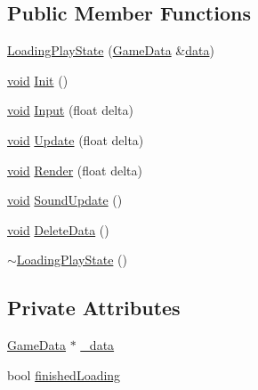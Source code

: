 \subsection*{Public Member Functions}
\begin{DoxyCompactItemize}
\item 
\hyperlink{classLoadingPlayState_a9715c14eced0140ceb64d6e30d00901e}{Loading\+Play\+State} (\hyperlink{structGameData}{Game\+Data} \&\hyperlink{imgui__impl__opengl3__loader_8h_abd87654504355b4c1bb002dcb1d4d16a}{data})
\item 
\hyperlink{imgui__impl__opengl3__loader_8h_ac668e7cffd9e2e9cfee428b9b2f34fa7}{void} \hyperlink{classLoadingPlayState_aaa131760db87f7dd206064105b53004c}{Init} ()
\item 
\hyperlink{imgui__impl__opengl3__loader_8h_ac668e7cffd9e2e9cfee428b9b2f34fa7}{void} \hyperlink{classLoadingPlayState_a69ec7d3e42aa57e4db484e201aae3c63}{Input} (float delta)
\item 
\hyperlink{imgui__impl__opengl3__loader_8h_ac668e7cffd9e2e9cfee428b9b2f34fa7}{void} \hyperlink{classLoadingPlayState_adab55fbf70ddda174590a55d59ec355b}{Update} (float delta)
\item 
\hyperlink{imgui__impl__opengl3__loader_8h_ac668e7cffd9e2e9cfee428b9b2f34fa7}{void} \hyperlink{classLoadingPlayState_a9f52c378fd76e40eb366d6da2c57ab11}{Render} (float delta)
\item 
\hyperlink{imgui__impl__opengl3__loader_8h_ac668e7cffd9e2e9cfee428b9b2f34fa7}{void} \hyperlink{classLoadingPlayState_a8676ff36334ce4de33a9874fe4a54c3f}{Sound\+Update} ()
\item 
\hyperlink{imgui__impl__opengl3__loader_8h_ac668e7cffd9e2e9cfee428b9b2f34fa7}{void} \hyperlink{classLoadingPlayState_a3735d8ecb6747de9ab62dddedf9eeaa3}{Delete\+Data} ()
\item 
\hyperlink{classLoadingPlayState_a46ffa983ebd3acac941838a564474550}{$\sim$\+Loading\+Play\+State} ()
\end{DoxyCompactItemize}
\subsection*{Private Attributes}
\begin{DoxyCompactItemize}
\item 
\hyperlink{structGameData}{Game\+Data} $\ast$ \hyperlink{classLoadingPlayState_ace02ea66ec0d0970fc523aca12cf9c24}{\+\_\+data}
\item 
bool \hyperlink{classLoadingPlayState_a1d656d0bcbc21c8f0c69f66b7c748145}{finished\+Loading}
\end{DoxyCompactItemize}


